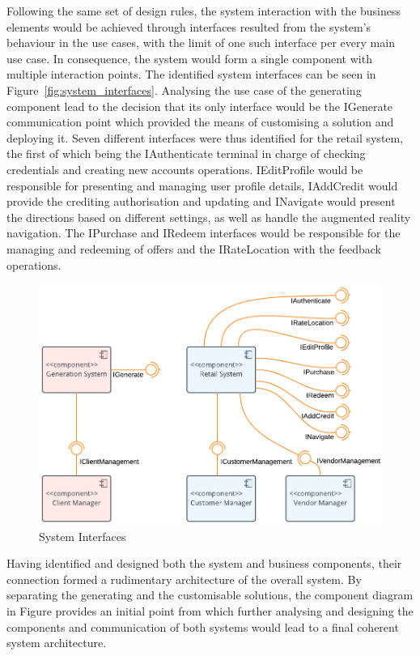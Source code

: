 Following the same set of design rules, the system interaction with the business elements would be achieved through interfaces resulted from the system's behaviour in the use cases, with the limit of one such interface per every main use case. In consequence, the system would form a single component with multiple interaction points. The identified system interfaces can be seen in Figure~\ref{fig:system_interfaces}. Analysing the use case of the generating component lead to the decision that its only interface would be the IGenerate communication point which provided the means of customising a solution and deploying it. Seven different interfaces were thus identified for the retail system, the first of which being the IAuthenticate terminal in charge of checking credentials and creating new accounts operations. IEditProfile would be responsible for presenting and managing user profile details, IAddCredit would provide the crediting authorisation and updating and INavigate would present the directions based on different settings, as well as handle the augmented reality navigation. The IPurchase and IRedeem interfaces would be responsible for the managing and redeeming of offers and the IRateLocation with the feedback operations.\\
\begin{figure}[!ht]
\centering
\includegraphics[scale=0.3]{img/Initial_Architecture}
\caption{System Interfaces}
\label{fig:initial_architecture}
\end{figure}

Having identified and designed both the system and business components, their connection formed a rudimentary architecture of the overall system. By separating the generating and the customisable solutions, the component diagram in Figure provides an initial point from which further analysing and designing the components and communication of both systems would lead to a final coherent system architecture.

